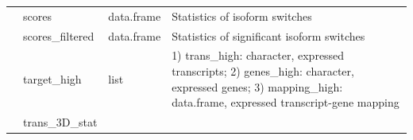 \documentclass[]{article}
\begin{document}
\begin{longtable}[]{@{}llll@{}}
\begin{minipage}[t]{0.08\columnwidth}\raggedright\strut
\strut
\end{minipage} & \begin{minipage}[t]{0.06\columnwidth}\raggedright\strut
scores\strut
\end{minipage} & \begin{minipage}[t]{0.04\columnwidth}\raggedright\strut
data.frame\strut
\end{minipage} & \begin{minipage}[t]{0.71\columnwidth}\raggedright\strut
Statistics of isoform switches\strut
\end{minipage}\tabularnewline
\begin{minipage}[t]{0.08\columnwidth}\raggedright\strut
\strut
\end{minipage} & \begin{minipage}[t]{0.06\columnwidth}\raggedright\strut
scores\_filtered\strut
\end{minipage} & \begin{minipage}[t]{0.04\columnwidth}\raggedright\strut
data.frame\strut
\end{minipage} & \begin{minipage}[t]{0.71\columnwidth}\raggedright\strut
Statistics of significant isoform switches\strut
\end{minipage}\tabularnewline
\begin{minipage}[t]{0.08\columnwidth}\raggedright\strut
\strut
\end{minipage} & \begin{minipage}[t]{0.06\columnwidth}\raggedright\strut
target\_high\strut
\end{minipage} & \begin{minipage}[t]{0.04\columnwidth}\raggedright\strut
list\strut
\end{minipage} & \begin{minipage}[t]{0.71\columnwidth}\raggedright\strut
1) trans\_high: character, expressed transcripts; 2) genes\_high:
character, expressed genes; 3) mapping\_high: data.frame, expressed
transcript-gene mapping\strut
\end{minipage}\tabularnewline
\begin{minipage}[t]{0.08\columnwidth}\raggedright\strut
\strut
\end{minipage} & \begin{minipage}[t]{0.06\columnwidth}\raggedright\strut
trans\_3D\_stat\strut
\end{minipage} & \begin{minipage}[t]{0.04\columnwidth}\raggedright\strut

\end{minipage}
\end{longtable}
\end{document}
